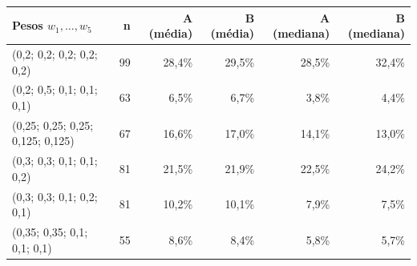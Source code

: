 \begin{tabular}{lrrrrr}
\toprule
Pesos $w_1,\ldots,w_5$ & n & A (média) & B (média) & A (mediana) & B (mediana) \\
\midrule
(0,2; 0,2; 0,2; 0,2; 0,2) & 99 & 28,4\% & 29,5\% & 28,5\% & 32,4\% \\
(0,2; 0,5; 0,1; 0,1; 0,1) & 63 & 6,5\% & 6,7\% & 3,8\% & 4,4\% \\
(0,25; 0,25; 0,25; 0,125; 0,125) & 67 & 16,6\% & 17,0\% & 14,1\% & 13,0\% \\
(0,3; 0,3; 0,1; 0,1; 0,2) & 81 & 21,5\% & 21,9\% & 22,5\% & 24,2\% \\
(0,3; 0,3; 0,1; 0,2; 0,1) & 81 & 10,2\% & 10,1\% & 7,9\% & 7,5\% \\
(0,35; 0,35; 0,1; 0,1; 0,1) & 55 & 8,6\% & 8,4\% & 5,8\% & 5,7\% \\
\bottomrule
\end{tabular}
